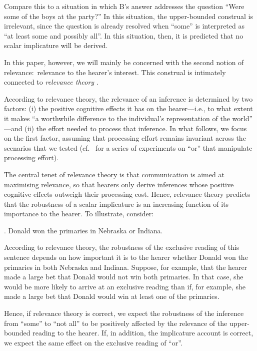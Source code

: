 \documentclass[12pt]{article}
\begin{document}
Compare this to a situation in which B's answer addresses the question ``Were some of the boys at the party?'' In this situation, the upper-bounded construal is irrelevant, since the question is already resolved when ``some'' is interpreted as ``at least some and possibly all''. In this situation, then, it is predicted that no scalar implicature will be derived.

In this paper, however, we will mainly be concerned with the second notion of relevance:\ relevance to the hearer's interest. This construal is intimately connected to \emph{relevance theory} \citep{sperber1995}.

According to relevance theory, the relevance of an inference is determined by two factors: (i) the positive cognitive effects it has on the hearer---i.e., to what extent it makes ``a worthwhile difference to the individual's representation of the world'' \citep[p.\ 251]{wilson2002}---and (ii) the effort needed to process that inference. In what follows, we focus on the first factor, assuming that processing effort remains invariant across the scenarios that we tested (cf.\ \citealt{chevallier2008} for a series of experiments on ``or'' that manipulate processing effort). 

The central tenet of relevance theory is that communication is aimed at maximising relevance, so that hearers only derive inferences whose positive cognitive effects outweigh their processing cost. Hence, relevance theory predicts that the robustness of a scalar implicature is an increasing function of its importance to the hearer. To illustrate, consider:

\ex.	Donald won the primaries in Nebraska or Indiana.

According to relevance theory, the robustness of the exclusive reading of this sentence depends on how important it is to the hearer whether Donald won the primaries in both Nebraska and Indiana. Suppose, for example, that the hearer made a large bet that Donald would not win both primaries. In that case, she would be more likely to arrive at an exclusive reading than if, for example, she made a large bet that Donald would win at least one of the primaries.

Hence, if relevance theory is correct, we expect the robustness of the inference from ``some'' to ``not all'' to be positively affected by the relevance of the upper-bounded reading to the hearer. If, in addition, the implicature account is correct, we expect the same effect on the exclusive reading of ``or''.
\end{document}
